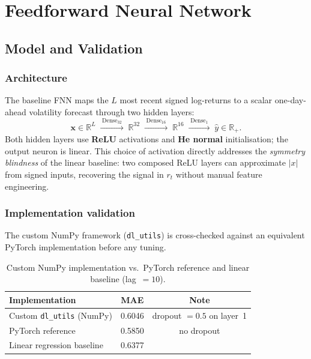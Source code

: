 \section{Feedforward Neural Network}
\label{sec:fnn}

\subsection{Model and Validation}

\subsubsection*{Architecture}

The baseline FNN maps the $L$ most recent signed log-returns to a scalar
one-day-ahead volatility forecast through two hidden layers:
\[
  \mathbf{x} \in \mathbb{R}^{L}
  \;\xrightarrow{\;\text{Dense}_{32}\;}\;
  \mathbb{R}^{32}
  \;\xrightarrow{\;\text{Dense}_{16}\;}\;
  \mathbb{R}^{16}
  \;\xrightarrow{\;\text{Dense}_{1}\;}\;
  \hat{y} \in \mathbb{R}_{+}.
\]
Both hidden layers use \textbf{ReLU} activations and \textbf{He normal}
initialisation; the output neuron is linear. This choice of activation directly
addresses the \emph{symmetry blindness} of the linear baseline: two composed ReLU
layers can approximate $\lvert x\rvert$ from signed inputs, recovering the
signal in $r_t$ without manual feature engineering.

\subsubsection*{Implementation validation}

The custom NumPy framework (\texttt{dl\_utils}) is cross-checked against an
equivalent PyTorch implementation before any tuning.

\begin{table}[H]
  \centering
  \caption{Custom NumPy implementation vs.\ PyTorch reference and linear baseline (lag~$=10$).}
  \label{tab:fnn_validation}
  \begin{tabular}{lcc}
    \toprule
    Implementation & MAE & Note \\
    \midrule
    Custom \texttt{dl\_utils} (NumPy) & 0.6046 & dropout $= 0.5$ on layer~1 \\
    PyTorch reference                 & 0.5850 & no dropout \\
    Linear regression baseline        & 0.6377 & \\
    \bottomrule
  \end{tabular}
\end{table}


